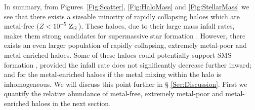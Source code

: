 \documentclass[twocolumn,iop,revtex4]{openjournal}
\newcommand{\zsolarc} {$\rm{Z_{\odot}}$}
\begin{document}
\indent In summary, from Figures~\ref{Fig:Scatter}, \ref{Fig:HaloMass}
and \ref{Fig:StellarMass} we see that there exists a sizeable minority of rapidly collapsing haloes
which are metal-free ($Z < 10^{-5}$ \zsolarc). These
haloes, due to their large mass infall rates, makes them strong candidates for supermassive
star formation \citep{Woods_2018, Chon_2020}. However,  there exists an even larger population of
rapidly collapsing, extremely metal-poor and metal enriched haloes. Some of these haloes could
potentially support SMS formation \citep[see e.g.][]{Chon_2020},
provided the infall rate does not significantly decrease further inward; 
and for the metal-enriched haloes if the metal mixing within the halo is inhomogeneous. We will discuss this point further in \S
\ref{Sec:Discussion}. First we quantify the relative abundance of metal-free, extremely metal-poor
and metal-enriched haloes
in the next section.
\end{document}
